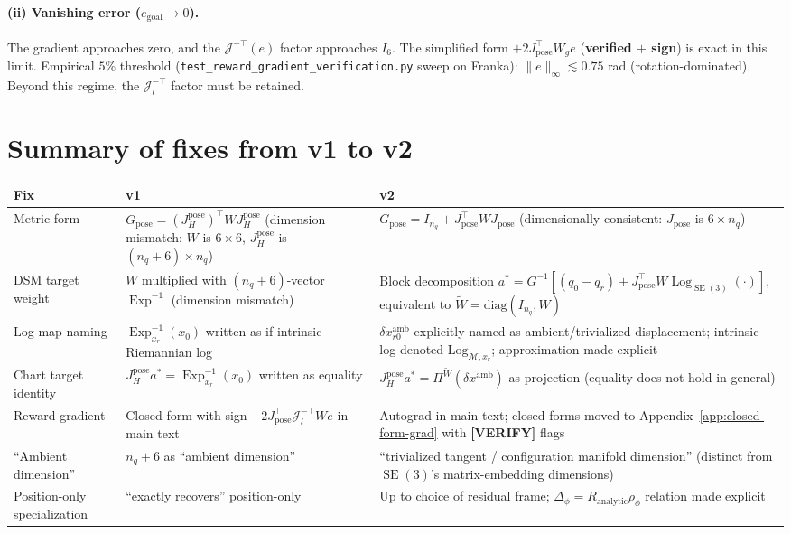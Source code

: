 \documentclass[11pt,a4paper]{article}
\DeclareMathOperator{\Exp}{Exp}
\DeclareMathOperator{\Log}{Log}
\DeclareMathOperator{\SE}{SE}
\newcommand{\Mset}{\mathcal{M}}
\newcommand{\Jpose}{J_{\text{pose}}}
\begin{document}
\paragraph{(ii) Vanishing error ($e_{\text{goal}} \to 0$).} The gradient approaches zero, and the $\mathcal{J}^{-\top}(e)$ factor approaches $I_6$. The simplified form $+2 \Jpose^\top W_g e$ (\textbf{verified $+$ sign}) is exact in this limit. Empirical $5\%$ threshold (\texttt{test\_reward\_gradient\_verification.py} sweep on Franka): $\|e\|_\infty \lesssim 0.75$ rad (rotation-dominated). Beyond this regime, the $\mathcal{J}_l^{-\top}$ factor must be retained.

\section{Summary of fixes from v1 to v2}

\begin{center}
\begin{tabular}{l|p{4cm}|p{4cm}}
\textbf{Fix} & \textbf{v1} & \textbf{v2} \\
\hline
Metric form & $G_{\text{pose}} = (J_H^{\text{pose}})^\top W J_H^{\text{pose}}$ (dimension mismatch: $W$ is $6\times 6$, $J_H^{\text{pose}}$ is $(n_q+6) \times n_q$) & $G_{\text{pose}} = I_{n_q} + \Jpose^\top W \Jpose$ (dimensionally consistent: $\Jpose$ is $6 \times n_q$) \\
\hline
DSM target weight & $W$ multiplied with $(n_q + 6)$-vector $\Exp^{-1}$ (dimension mismatch) & Block decomposition $a^* = G^{-1}[(q_0-q_r) + \Jpose^\top W \Log_{\SE(3)}(\cdot)]$, equivalent to $\widetilde W = \mathrm{diag}(I_{n_q}, W)$ \\
\hline
Log map naming & $\Exp^{-1}_{x_r}(x_0)$ written as if intrinsic Riemannian log & $\delta x^{\text{amb}}_{r0}$ explicitly named as ambient/trivialized displacement; intrinsic log denoted $\mathrm{Log}_{\Mset, x_r}$; approximation made explicit \\
\hline
Chart target identity & $J_H^{\text{pose}} a^* = \Exp^{-1}_{x_r}(x_0)$ written as equality & $J_H^{\text{pose}} a^* = \Pi^{\widetilde W}(\delta x^{\text{amb}})$ as projection (equality does not hold in general) \\
\hline
Reward gradient & Closed-form with sign $-2 \Jpose^\top \mathcal{J}_l^{-\top} W e$ in main text & Autograd in main text; closed forms moved to Appendix~\ref{app:closed-form-grad} with \textbf{[VERIFY]} flags \\
\hline
``Ambient dimension'' & $n_q + 6$ as ``ambient dimension'' & ``trivialized tangent / configuration manifold dimension'' (distinct from $\SE(3)$'s matrix-embedding dimensions) \\
\hline
Position-only specialization & ``exactly recovers'' position-only & Up to choice of residual frame; $\Delta_\phi = R_{\text{analytic}} \rho_\phi$ relation made explicit \\
\end{tabular}
\end{center}
\end{document}
